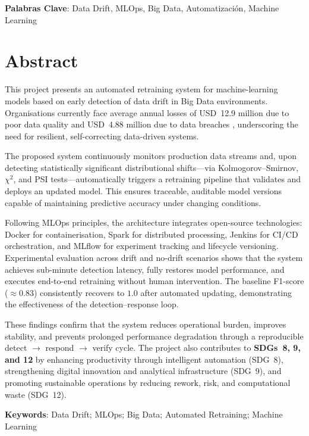 \textbf{Palabras Clave}: Data Drift, MLOps, Big Data, Automatización, Machine Learning

\chapter*{Abstract}
This project presents an automated retraining system for machine-learning models based on early detection of data drift in Big Data environments. Organisations currently face average annual losses of USD~12.9 million due to poor data quality and USD~4.88 million due to data breaches \citep{Gartner2024,IBM2024}, underscoring the need for resilient, self-correcting data-driven systems.

The proposed system continuously monitors production data streams and, upon detecting statistically significant distributional shifts—via Kolmogorov--Smirnov, $\chi^2$, and PSI tests—automatically triggers a retraining pipeline that validates and deploys an updated model. This ensures traceable, auditable model versions capable of maintaining predictive accuracy under changing conditions.

Following MLOps principles, the architecture integrates open-source technologies: Docker for containerisation, Spark for distributed processing, Jenkins for CI/CD orchestration, and MLflow for experiment tracking and lifecycle versioning. Experimental evaluation across drift and no-drift scenarios shows that the system achieves sub-minute detection latency, fully restores model performance, and executes end-to-end retraining without human intervention. The baseline F1-score ($\approx 0.83$) consistently recovers to $1.0$ after automated updating, demonstrating the effectiveness of the detection--response loop.

These findings confirm that the system reduces operational burden, improves stability, and prevents prolonged performance degradation through a reproducible detect $\rightarrow$ respond $\rightarrow$ verify cycle. The project also contributes to \textbf{SDGs~8, 9, and 12} by enhancing productivity through intelligent automation (SDG~8), strengthening digital innovation and analytical infrastructure (SDG~9), and promoting sustainable operations by reducing rework, risk, and computational waste (SDG~12).

\textbf{Keywords}: Data Drift; MLOps; Big Data; Automated Retraining; Machine Learning
